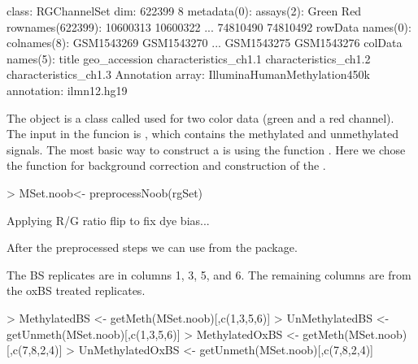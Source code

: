 \documentclass{article}
\begin{document}
\begin{Schunk}
\begin{Soutput}
class: RGChannelSet 
dim: 622399 8 
metadata(0):
assays(2): Green Red
rownames(622399): 10600313 10600322 ... 74810490 74810492
rowData names(0):
colnames(8): GSM1543269 GSM1543270 ... GSM1543275 GSM1543276
colData names(5): title geo_accession characteristics_ch1.1
  characteristics_ch1.2 characteristics_ch1.3
Annotation
  array: IlluminaHumanMethylation450k
  annotation: ilmn12.hg19
\end{Soutput}
\end{Schunk}

The  object is a class called  used for two color data (green and a red channel). The input in the  funcion is  , which contains the methylated and unmethylated signals. The most basic way to construct a  is  using the function . Here we chose the function  for background correction and construction of the .


\begin{Schunk}
\begin{Sinput}
> MSet.noob<- preprocessNoob(rgSet)
\end{Sinput}
\begin{Soutput}
[preprocessNoob] Applying R/G ratio flip to fix dye bias...
\end{Soutput}
\end{Schunk}


After the preprocessed steps we can use  from the  package.


The BS replicates are in columns 1, 3, 5, and 6. The remaining columns are from the oxBS treated replicates.

\begin{Schunk}
\begin{Sinput}
> MethylatedBS <- getMeth(MSet.noob)[,c(1,3,5,6)]
> UnMethylatedBS <- getUnmeth(MSet.noob)[,c(1,3,5,6)]
> MethylatedOxBS <- getMeth(MSet.noob)[,c(7,8,2,4)]
> UnMethylatedOxBS <- getUnmeth(MSet.noob)[,c(7,8,2,4)]
\end{Sinput}
\end{Schunk}
\end{document}
